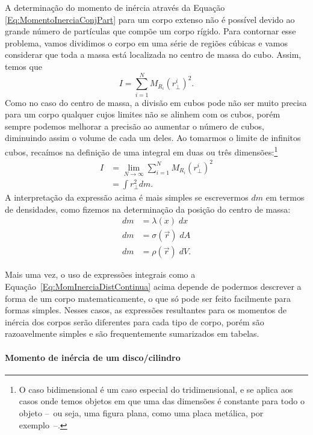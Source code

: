 A determinação do momento de inércia através da Equação \eqref{Eq:MomentoInerciaConjPart} para um corpo extenso não é possível devido ao grande número de partículas que compõe um corpo rígido. Para contornar esse problema, vamos dividimos o corpo em uma série de regiões cúbicas e vamos considerar que toda a massa está localizada no centro de massa do cubo. Assim, temos que
\begin{equation}
    I = \sum_{i = 1}^N M_{R_i} (r_\perp^i)^2.
\end{equation}
%
Como no caso do centro de massa, a divisão em cubos pode não ser muito precisa para um corpo qualquer cujos limites não se alinhem com os cubos, porém sempre podemos melhorar a precisão ao aumentar o número de cubos, diminuindo assim o volume de cada um deles. Ao tomarmos o limite de infinitos cubos, recaímos na definição de uma integral em duas ou três dimensões:\footnote{O caso bidimensional é um caso especial do tridimensional, e se aplica aos casos onde temos objetos em que uma das dimensões é constante para todo o objeto --~ou seja, uma figura plana, como uma placa metálica, por exemplo~--.}
\begin{align}
    I &= \lim_{N \to \infty} \sum_{i = 1}^N M_{R_i} (r_\perp^i)^2 \\
    &= \int r_\perp^2 dm. \label{Eq:MomInerciaDistContinua}
\end{align}
%
A interpretação da expressão acima é mais simples se escrevermos $dm$ em termos de densidades, como fizemos na determinação da posição do centro de massa:
\begin{align}
    dm &= \lambda(x) \; dx \\
    dm &= \sigma(\vec{r}) \;dA \\
    dm &= \rho(\vec{r}) \; dV. \label{Eq:DiferencialDeMassaVolume}
\end{align}

Mais uma vez, o uso de expressões integrais como a Equação~\eqref{Eq:MomInerciaDistContinua} acima depende de podermos descrever a forma de um corpo matematicamente, o que só pode ser feito facilmente para formas simples. Nesses casos, as expressões resultantes para os momentos de inércia dos corpos serão diferentes para cada tipo de corpo, porém são razoavelmente simples e são frequentemente sumarizados em tabelas.

\paragraph{Momento de inércia de um disco/cilindro}

